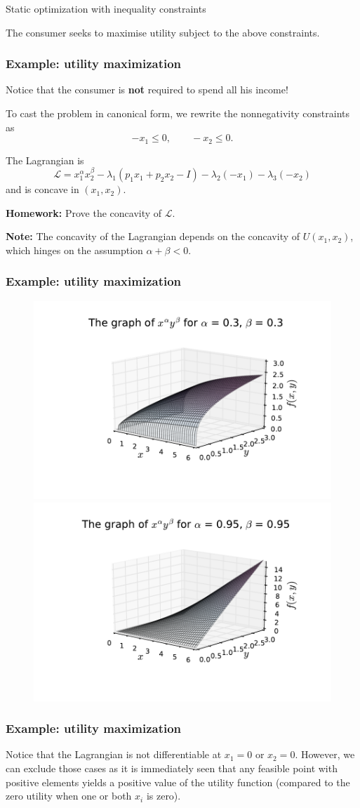\documentclass[10pt]{beamer}
\theoremstyle{definition}
\begin{document}
\begin{section}{Static optimization with inequality constraints}
\begin{frame}[fragile]
The consumer seeks to maximise utility subject to the above constraints.
\end{frame}

\begin{frame}[fragile]
\frametitle{Example: utility maximization}
Notice that the consumer is \textbf{not} required to spend all his income!\bigskip

To cast the problem in canonical form, we rewrite the nonnegativity constraints as
\[ -x_1\leq 0 , \qquad -x_2 \leq 0. \] \bigskip

The Lagrangian is \[ \mathcal{L} = x_1^\alpha x_2^\beta - \lambda_1 ( p_1 x_1 + p_2 x_2 - I) -\lambda_2 (-x_1) - \lambda_3 (-x_2) \] and is {\color{red}concave} in $ (x_1,x_2) $.\bigskip

\textbf{Homework:} Prove the concavity of $ \mathcal{L} $.\bigskip

\textbf{Note: }The concavity of the Lagrangian depends on the concavity of $ U(x_1,x_2) $, which hinges on the assumption $ \alpha+\beta < 0 $.
\end{frame}

\begin{frame}[fragile]
\frametitle{Example: utility maximization}
\begin{figure}
\centering
\includegraphics[width=0.5\linewidth]{ConcF}
\includegraphics[width=0.5\linewidth]{NonConcF}
\end{figure}
\end{frame}

\begin{frame}[fragile]
\frametitle{Example: utility maximization}
Notice that the Lagrangian is not differentiable at $ x_1=0 $ or $ x_2=0 $. However, we can exclude those cases as it is immediately seen that any feasible point with positive elements yields a positive value of the utility function (compared to the zero utility when one or both $ x_i $ is zero).\bigskip


\end{frame}
\end{section}
\end{document}
